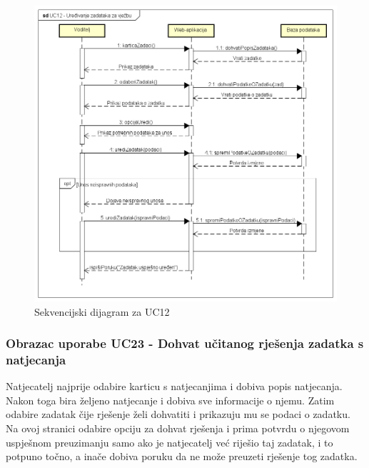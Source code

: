 				\begin{figure}[H]
					\includegraphics[width=\textwidth]{slike/SEQ_UC12.PNG}
					\caption{Sekvencijski dijagram za UC12}
					\label{fig:seq_uc12}
				\end{figure}
				\eject
				
				\subsubsection{Obrazac uporabe UC23 - Dohvat učitanog rješenja zadatka s natjecanja}
				
				\noindent Natjecatelj najprije odabire karticu s natjecanjima i dobiva popis natjecanja. Nakon toga bira željeno natjecanje i dobiva sve informacije o njemu. Zatim odabire zadatak čije rješenje želi dohvatiti i prikazuju mu se podaci o zadatku. Na ovoj stranici odabire opciju za dohvat rješenja i prima potvrdu o njegovom uspješnom preuzimanju samo ako je natjecatelj već riješio taj zadatak, i to potpuno točno, a inače dobiva poruku da ne može preuzeti rješenje tog zadatka. 
				
